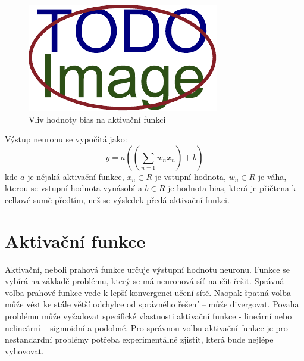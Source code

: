 \begin{figure}[H]
    \centering
    \includegraphics[scale=1]{obrazky-figures/placeholder.pdf}
    \caption{\label{fig:bias}Vliv hodnoty bias na aktivační funkci}
\end{figure}

Výstup neuronu se vypočítá jako:
\begin{equation}
y = a((\sum_{n=1} w_nx_n) + b)
\end{equation}
kde $a$ je nějaká aktivační funkce, $x_n \in R$ je vstupní hodnota, $w_n \in R$ je váha, kterou se vstupní hodnota vynásobí a $b \in R$ je hodnota bias, která je přičtena k celkové sumě předtím, než se výsledek předá aktivační funkci.


\section{Aktivační funkce}
Aktivační, neboli prahová funkce určuje výstupní hodnotu neuronu. Funkce se vybírá na základě problému, který se má neuronová síť naučit řešit. Správná volba prahové funkce vede k lepší konvergenci učení sítě. Naopak špatná volba může vést ke stále větší odchylce od správného řešení -- může divergovat. Povaha problému může vyžadovat specifické vlastnosti aktivační funkce - lineární nebo nelineární -- sigmoidní a podobně. Pro správnou volbu aktivační funkce je pro nestandardní problémy potřeba experimentálně zjistit, která bude nejlépe vyhovovat.

